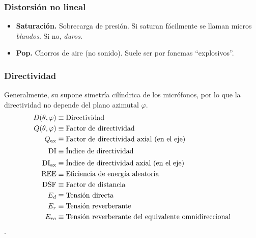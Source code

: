 \documentclass[a4paper, 8pt]{extarticle}
\begin{document}
\begin{multicols}{3}
  \subsubsection{Distorsión no lineal}
  \begin{itemize}
    \item \textbf{Saturación.} Sobrecarga de presión. Si saturan fácilmente se llaman micros \textit{blandos}. Si no, \textit{duros}.
    \item \textbf{Pop.} Chorros de aire (no sonido). Suele ser por fonemas ``explosivos''.
  \end{itemize}
  \subsubsection{Directividad}
  Generalmente, su supone simetría cilíndrica de los micrófonos, por lo que la directividad no depende del plano azimutal $\varphi$.
  \begin{align*}
    D(\theta, \varphi )          & \equiv \text{Directividad}                                         \\
    Q(\theta, \varphi )          & \equiv \text{Factor de directividad}                               \\
    Q _{\textnormal{ax}}         & \equiv \text{Factor de directividad axial (en el eje)}             \\
    \text{DI}                    & \equiv \text{Índice de directividad}                               \\
    \text{DI} _{\textnormal{ax}} & \equiv \text{Índice de directividad axial (en el eje)}             \\
    \text{REE}                   & \equiv \text{Eficiencia de energía aleatoria}                      \\
    \text{DSF}                   & \equiv \text{Factor de distancia}                                  \\
    E_d                          & \equiv \text{Tensión directa}                                      \\
    E_r                          & \equiv \text{Tensión reverberante}                                 \\
    E_{ro}                       & \equiv \text{Tensión reverberante del equivalente omnidireccional} \\
  \end{align*}.


\end{multicols}
\end{document}
